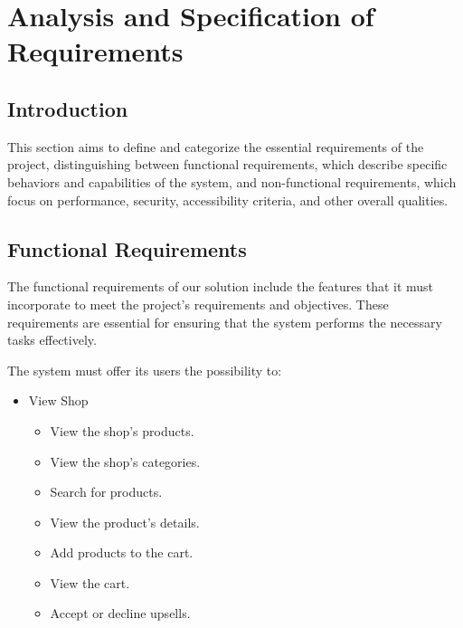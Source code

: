 \chapter{Analysis and Specification of Requirements}
\setcounter{minitocdepth}{1}
\minitoc
\newpage

\section{Introduction}
This section aims to define and categorize the essential requirements of the project, distinguishing between functional requirements, which describe specific behaviors and capabilities of the system, and non-functional requirements, which focus on performance, security, accessibility criteria, and other overall qualities.

\section{Functional Requirements}
The functional requirements of our solution include the features that it must incorporate to meet the project's requirements and objectives. These requirements are essential for ensuring that the system performs the necessary tasks effectively.

The system must offer its users the possibility to:

\begin{itemize}
    \item View Shop
    \begin{itemize}
        \item View the shop's products.
        \item View the shop's categories.
        \item Search for products.
        \item View the product's details.
        \item Add products to the cart.
        \item View the cart.
        \item Accept or decline upsells.
    \end{itemize}
\end{itemize}

